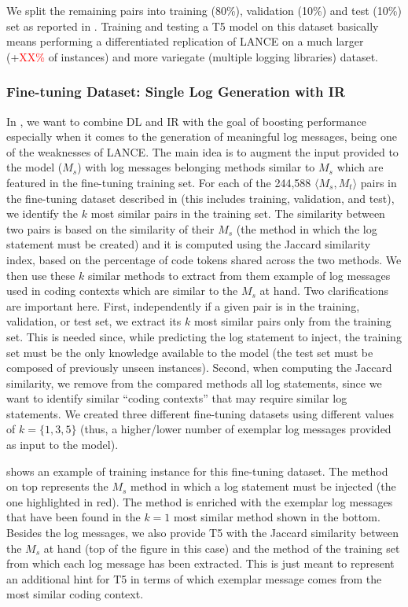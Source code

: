 We split the remaining pairs into training (80\%), validation (10\%) and test (10\%) set as reported in . Training and testing a T5 model on this dataset basically means performing a differentiated replication of LANCE on a much larger (+\textcolor{red}{XX\%} of instances) and more variegate (multiple logging libraries) dataset.

\subsubsection{Fine-tuning Dataset: Single Log Generation with IR} \label{sec:single-log-plus-IR}

In \approach, we want to combine DL and IR with the goal of boosting performance especially when it comes to the generation of meaningful log messages, being one of the weaknesses of LANCE. The main idea is to augment the input provided to the model (\ie $M_{s}$) with log messages belonging methods similar to $M_{s}$ which are featured in the fine-tuning training set. For each of the 244,588 $\langle M_s, M_t \rangle$ pairs in the fine-tuning dataset described in  (this includes training, validation, and test), we identify the $k$ most similar pairs in the training set. The similarity between two pairs is based on the similarity of their $M_s$ (\ie the method in which the log statement must be created) and it is computed using the Jaccard similarity \cite{hancock2004jaccard} index, based on the percentage of code tokens shared across the two methods. We then use these $k$ similar methods to extract from them example of log messages used in coding contexts which are similar to the $M_s$ at hand. Two clarifications are important here. First, independently if a given pair is in the training, validation, or test set, we extract its $k$ most similar pairs only from the training set. This is needed since, while predicting the log statement to inject, the training set must be the only knowledge available to the model (\ie the test set must be composed of previously unseen instances). Second, when computing the Jaccard similarity, we remove from the compared methods all log statements, since we want to identify similar ``coding contexts'' that may require similar log statements. We created three different fine-tuning datasets using different values of $k=\{1,3,5\}$ (thus, a higher/lower number of exemplar log messages provided as input to the model).

\figref{} shows an example of training instance for this fine-tuning dataset. The method on top represents the $M_{s}$ \java method in which a log statement must be injected (\ie the one highlighted in red). The method is enriched with the exemplar log messages that have been found in the $k=1$ most similar method shown in the bottom. Besides the log messages, we also provide T5 with the Jaccard similarity between the $M_{s}$ at hand (top of the figure in this case) and the method of the training set from which each log message has been extracted. This is just meant to represent an additional hint for T5 in terms of which exemplar message comes from the most similar coding context.

